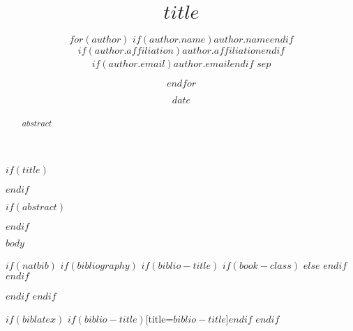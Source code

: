 \documentclass[11pt]{article}
\title{$title$}
\author{$for(author)$
           $if(author.name)$$author.name$$endif$ \\
           $if(author.affiliation)$$author.affiliation$$endif$ \\
           $if(author.email)${\tt $author.email$}$endif$
           $sep$ \and
        $endfor$}
\date{$date$}
\begin{document}
$if(title)$\maketitle$endif$

$if(abstract)$
\begin{abstract}
    $abstract$
\end{abstract}
$endif$

$body$

$if(natbib)$
$if(bibliography)$
$if(biblio-title)$
$if(book-class)$
\renewcommand\bibname{$biblio-title$}
$else$
\renewcommand\refname{$biblio-title$}
$endif$
$endif$



$endif$
$endif$

$if(biblatex)$
\printbibliography$if(biblio-title)$[title=$biblio-title$]$endif$
$endif$
\end{document}
